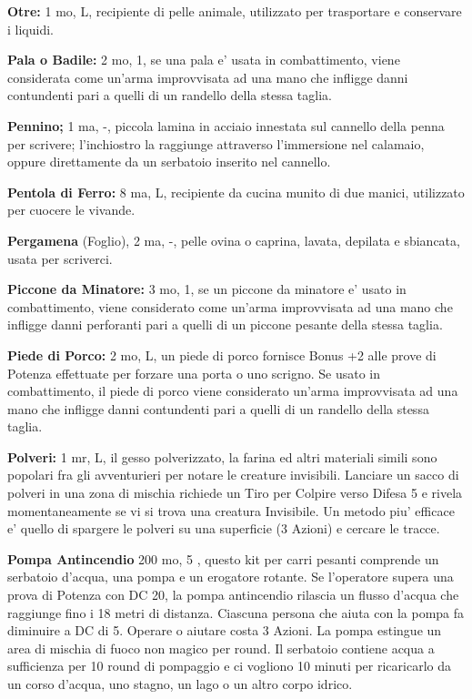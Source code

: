 \documentclass[a4paper,11pt,twoside,openany]{book}
\begin{document}
{\textbf{Otre:} 1 mo, L, recipiente di pelle animale, utilizzato per trasportare e conservare i liquidi.

\textbf{Pala o Badile:} 2 mo, 1, se una pala e' usata in combattimento, viene considerata come un'arma improvvisata ad una mano che infligge danni contundenti pari a quelli di un randello della stessa taglia. 

\textbf{Pennino;} 1 ma, -, piccola lamina in acciaio innestata sul cannello della penna per scrivere; l'inchiostro la raggiunge attraverso l'immersione nel calamaio, oppure direttamente da un serbatoio inserito nel cannello.

\textbf{Pentola di Ferro:} 8 ma, L, recipiente da cucina munito di due manici, utilizzato per cuocere le vivande.

\textbf{Pergamena} (Foglio), 2 ma, -, pelle ovina o caprina, lavata, depilata e sbiancata, usata per scriverci.

\textbf{Piccone da Minatore:} 3 mo, 1, se un piccone da minatore e' usato in combattimento, viene considerato come un'arma improvvisata ad una mano che infligge danni perforanti pari a quelli di un piccone pesante della stessa taglia.

\textbf{Piede di Porco:} 2 mo, L, un piede di porco fornisce Bonus +2 alle prove di Potenza effettuate per forzare una porta o uno scrigno. Se usato in combattimento, il piede di porco viene considerato un'arma improvvisata ad una mano che infligge danni contundenti pari a quelli di un randello della stessa taglia.

\textbf{Polveri:} 1 mr, L, il gesso polverizzato, la farina ed altri materiali simili sono popolari fra gli avventurieri per notare le creature invisibili. Lanciare un sacco di polveri in una zona di mischia richiede un Tiro per Colpire verso Difesa 5 e rivela momentaneamente se vi si trova una creatura Invisibile. Un metodo piu' efficace e' quello di spargere le polveri su una superficie (3 Azioni) e cercare le tracce.

\textbf{Pompa Antincendio} 200 mo, 5 , questo kit per carri pesanti comprende un serbatoio d'acqua, una pompa e un erogatore rotante. Se l'operatore supera una prova di Potenza con DC 20, la pompa antincendio rilascia un flusso d'acqua che raggiunge fino i 18 metri di distanza. Ciascuna persona che aiuta con la pompa fa diminuire a DC di 5. Operare o aiutare costa 3 Azioni. La pompa estingue un area di mischia di fuoco non magico per round. Il serbatoio contiene acqua a sufficienza per 10 round di pompaggio e ci vogliono 10 minuti per ricaricarlo da un corso d'acqua, uno stagno, un lago o un altro corpo idrico.

}
\end{document}
